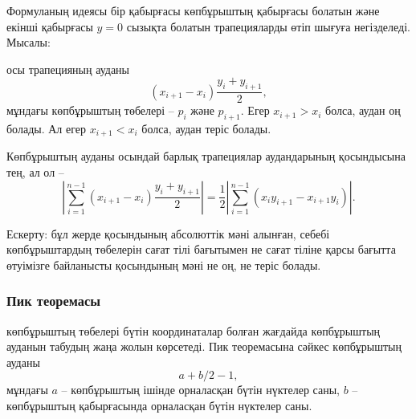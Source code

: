 Формуланың идеясы бір қабырғасы көпбұрыштың қабырғасы болатын 
және екінші қабырғасы $y=0$ сызықта болатын трапецияларды
өтіп шығуға негізделеді.
Мысалы:
\begin{center}
\end{center}
осы трапецияның ауданы
\[(x_{i+1}-x_{i}) \frac{y_i+y_{i+1}}{2},\]
мұндағы көпбұрыштың төбелері -- $p_i$ және $p_{i+1}$.
Егер $x_{i+1}>x_{i}$ болса, аудан оң болады.
Ал егер  $x_{i+1}<x_{i}$ болса, аудан теріс болады.

Көпбұрыштың ауданы осындай барлық трапециялар
аудандарының қосындысына тең, ал ол --
\[|\sum_{i=1}^{n-1} (x_{i+1}-x_{i}) \frac{y_i+y_{i+1}}{2}| =
\frac{1}{2} |\sum_{i=1}^{n-1} (x_i y_{i+1} - x_{i+1} y_i)|.\]

Ескерту: бұл жерде қосындының абсолюттік мәні алынған, себебі
көпбұрыштардың төбелерін сағат тілі бағытымен не сағат тіліне
қарсы бағытта өтуімізге байланысты қосындының мәні не оң, не теріс болады.


\subsubsection{Пик теоремасы}


 көпбұрыштың төбелері бүтін координаталар 
болған жағдайда көпбұрыштың ауданын табудың жаңа жолын көрсетеді.
Пик теоремасына сәйкес көпбұрыштың ауданы 
\[ a + b/2 -1,\]
мұндағы $a$ -- көпбұрыштың ішінде орналасқан бүтін нүктелер саны,
$b$ -- көпбұрыштың қабырғасында орналасқан бүтін нүктелер саны.

